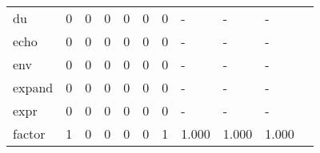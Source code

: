 \begin{longtable}{lp{1.2cm}p{1.2cm}p{1.2cm}p{1.2cm}p{1.2cm}p{1.2cm}p{1.2cm}p{1.2cm}p{1.2cm}p{1.2cm}}
du        &                                     0 &                                                  0 &                                                  0 &                                                  0 &                                                  0 &                                                  0 &                                                  - &                                                  - &                                                  - \\
echo      &                                     0 &                                                  0 &                                                  0 &                                                  0 &                                                  0 &                                                  0 &                                                  - &                                                  - &                                                  - \\
env       &                                     0 &                                                  0 &                                                  0 &                                                  0 &                                                  0 &                                                  0 &                                                  - &                                                  - &                                                  - \\
expand    &                                     0 &                                                  0 &                                                  0 &                                                  0 &                                                  0 &                                                  0 &                                                  - &                                                  - &                                                  - \\
expr      &                                     0 &                                                  0 &                                                  0 &                                                  0 &                                                  0 &                                                  0 &                                                  - &                                                  - &                                                  - \\
factor    &                                     1 &                                                  0 &                                                  0 &                                                  0 &                                                  0 &                                                  1 &                                              1.000 &                                              1.000 &                                              1.000 \\

\end{longtable}
